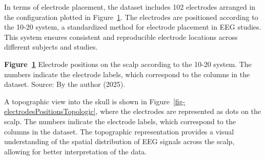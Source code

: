 \documentclass[
  letterpaper,
  DIV=11,
  numbers=noendperiod]{scrartcl}
\begin{document}
In terms of electrode placement, the dataset includes 102 electrodes
arranged in the configuration plotted in
Figure~\ref{fig-electrodesPositions}. The electrodes are positioned
according to the 10-20 system, a standardized method for electrode
placement in EEG studies. This system ensures consistent and
reproducible electrode locations across different subjects and studies.

\begin{figure}


\caption{\label{fig-electrodesPositions}}

\end{figure}%

\textbf{Figure~\ref{fig-electrodesPositions}} Electrode positions on the
scalp according to the 10-20 system. The numbers indicate the electrode
labels, which correspond to the columns in the dataset. Source: By the
author (2025).

A topographic view into the skull is shown in
Figure~\ref{fig-electrodesPositionsTopologic}, where the electrodes are
represented as dots on the scalp. The numbers indicate the electrode
labels, which correspond to the columns in the dataset. The topographic
representation provides a visual understanding of the spatial
distribution of EEG signals across the scalp, allowing for better
interpretation of the data.
\end{document}

